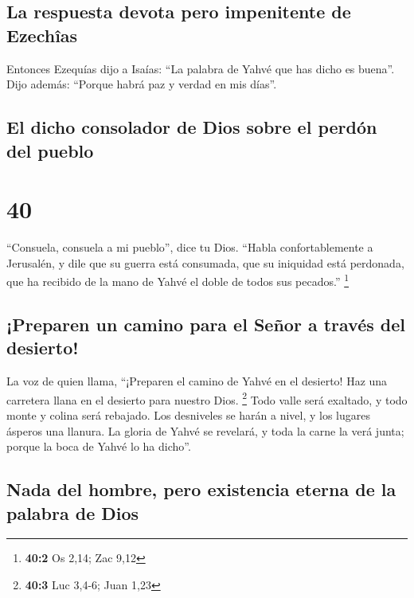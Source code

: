 \hypertarget{la-respuesta-devota-pero-impenitente-de-ezechuxeeas}{%
\subsection{La respuesta devota pero impenitente de
Ezechîas}\label{la-respuesta-devota-pero-impenitente-de-ezechuxeeas}}

 Entonces Ezequías dijo a Isaías: ``La palabra de Yahvé
que has dicho es buena''. Dijo además: ``Porque habrá paz y verdad en
mis días''.

\hypertarget{el-dicho-consolador-de-dios-sobre-el-perduxf3n-del-pueblo}{%
\subsection{El dicho consolador de Dios sobre el perdón del
pueblo}\label{el-dicho-consolador-de-dios-sobre-el-perduxf3n-del-pueblo}}

\hypertarget{section-39}{%
\section{40}\label{section-39}}

 ``Consuela, consuela a mi pueblo'', dice tu Dios.
 ``Habla confortablemente a Jerusalén, y dile que su
guerra está consumada, que su iniquidad está perdonada, que ha recibido
de la mano de Yahvé el doble de todos sus pecados.'' \footnote{\textbf{40:2}
  Os 2,14; Zac 9,12}

\hypertarget{preparen-un-camino-para-el-seuxf1or-a-travuxe9s-del-desierto}{%
\subsection{¡Preparen un camino para el Señor a través del
desierto!}\label{preparen-un-camino-para-el-seuxf1or-a-travuxe9s-del-desierto}}

 La voz de quien llama, ``¡Preparen el camino de Yahvé en
el desierto! Haz una carretera llana en el desierto para nuestro Dios.
\footnote{\textbf{40:3} Luc 3,4-6; Juan 1,23}  Todo valle
será exaltado, y todo monte y colina será rebajado. Los desniveles se
harán a nivel, y los lugares ásperos una llanura.  La
gloria de Yahvé se revelará, y toda la carne la verá junta; porque la
boca de Yahvé lo ha dicho''.

\hypertarget{nada-del-hombre-pero-existencia-eterna-de-la-palabra-de-dios}{%
\subsection{Nada del hombre, pero existencia eterna de la palabra de
Dios}\label{nada-del-hombre-pero-existencia-eterna-de-la-palabra-de-dios}}

